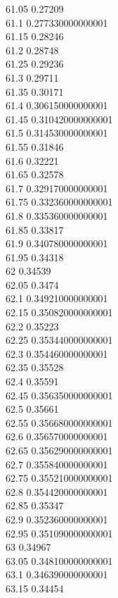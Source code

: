 {61.05	0.27209\\
61.1	0.277330000000001\\
61.15	0.28246\\
61.2	0.28748\\
61.25	0.29236\\
61.3	0.29711\\
61.35	0.30171\\
61.4	0.306150000000001\\
61.45	0.310420000000001\\
61.5	0.314530000000001\\
61.55	0.31846\\
61.6	0.32221\\
61.65	0.32578\\
61.7	0.329170000000001\\
61.75	0.332360000000001\\
61.8	0.335360000000001\\
61.85	0.33817\\
61.9	0.340780000000001\\
61.95	0.34318\\
62	0.34539\\
62.05	0.3474\\
62.1	0.349210000000001\\
62.15	0.350820000000001\\
62.2	0.35223\\
62.25	0.353440000000001\\
62.3	0.354460000000001\\
62.35	0.35528\\
62.4	0.35591\\
62.45	0.356350000000001\\
62.5	0.35661\\
62.55	0.356680000000001\\
62.6	0.356570000000001\\
62.65	0.356290000000001\\
62.7	0.355840000000001\\
62.75	0.355210000000001\\
62.8	0.354420000000001\\
62.85	0.35347\\
62.9	0.352360000000001\\
62.95	0.351090000000001\\
63	0.34967\\
63.05	0.348100000000001\\
63.1	0.346390000000001\\
63.15	0.34454\\
}
